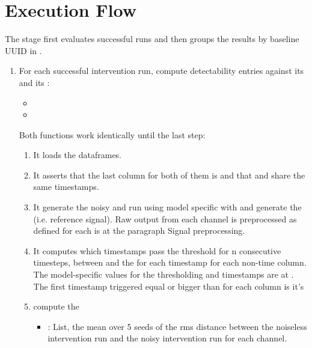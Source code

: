 \documentclass[11pt]{article}
\begin{document}
\section*{Execution Flow}

The stage first evaluates successful runs and then groups the results by baseline UUID in .

\begin{enumerate}
\item For each successful intervention run, compute detectability entries against its  and its :
\begin{itemize}
  \item {}
  \item {}
\end{itemize}
Both functions work identically until the last step:
\begin{enumerate}
\item It loads the dataframes.
\item It asserts that the last column for both of them is  and that  and  share the same timestamps.
\item It generate the noisy and  run using model specific  with  and generate the  (i.e. reference signal).
Raw output from each channel is preprocessed as defined for each \termSimulator is  at the paragraph Signal preprocessing.
\item It computes which timestamps pass the \termSRD threshold for n consecutive timesteps, between  and the   for each timestamp for each non-time column.
The model-specific values for the thresholding and timestamps are at . 
The first timestamp triggered equal or bigger than  for each column is it's 
\item compute the  
\begin{itemize}
  \item {}: List, the mean over 5 seeds of the rms distance between the noiseless intervention run and the noisy intervention run for each channel.

\end{itemize}
\end{enumerate}
\end{enumerate}
\end{document}

